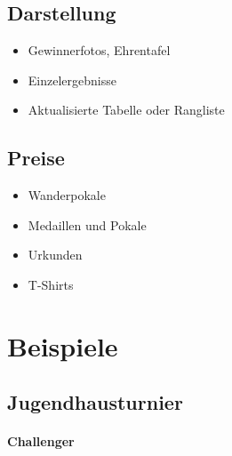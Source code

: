 \subsection{Darstellung}
\label{turniere:ergebnisse:formate}

\begin{itemize}
\item Gewinnerfotos, Ehrentafel
\item Einzelergebnisse
\item Aktualisierte Tabelle oder Rangliste  
\end{itemize}

\subsection{Preise}
\label{turniere:ergebnisse:preise}

\begin{itemize}
\item Wanderpokale
\item Medaillen und Pokale
\item Urkunden
\item T-Shirts
\end{itemize}

\section{Beispiele}
\label{turniere:beispiele}


\subsection{Jugendhausturnier}
\label{turniere:beispiele:jugend}




\paragraph{Challenger}
\label{turniere:beispiele:challenger}
